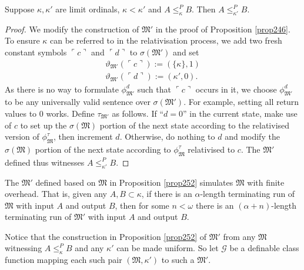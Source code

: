 \documentclass[12pt]{article}
\numberwithin{equation}{section}
\begin{document}
\begin{prop}\label{prop252}
Suppose $\kappa, \kappa'$ are limit ordinals, $\kappa < \kappa'$ and $A \leq^P_{\kappa} B$. Then $A \leq^P_{\kappa'} B$.
\end{prop}

\begin{proof}
We modify the construction of $\mathfrak{M}'$ in the proof of Proposition \ref{prop246}. To ensure $\kappa$ can be referred to in the relativisation process, we add two fresh constant symbols $\ulcorner c \urcorner$ and $\ulcorner d \urcorner$ to $\sigma(\mathfrak{M'})$ and set
\begin{gather*}
    \vartheta_{\mathfrak{M}'}(\ulcorner c \urcorner) := (\{\kappa\}, 1) \\
    \vartheta_{\mathfrak{M}'}(\ulcorner d \urcorner) := (\kappa', 0) \text{.}
\end{gather*}
As there is no way to formulate $\phi^d_{\mathfrak{M}'}$ such that $\ulcorner c \urcorner$ occurs in it, we choose $\phi^d_{\mathfrak{M}'}$ to be any universally valid sentence over $\sigma(\mathfrak{M'})$. For example, setting all return values to $0$ works. Define $\tau_{\mathfrak{M}'}$ as follows. If ``$d = 0$'' in the current state, make use of $c$ to set up the $\sigma(\mathfrak{M})$ portion of the next state according to the relativised version of $\phi^{\tau}_{\mathfrak{M}}$, then increment $d$. Otherwise, do nothing to $d$ and modify the $\sigma(\mathfrak{M})$ portion of the next state according to $\phi^{\tau}_{\mathfrak{M}}$ relativised to $c$. The $\mathfrak{M}'$ defined thus witnesses $A \leq^P_{\kappa'} B$.
\end{proof}

\begin{rem}\label{rem256}
The $\mathfrak{M}'$ defined based on $\mathfrak{M}$ in Proposition \ref{prop252} simulates $\mathfrak{M}$ with finite overhead. That is, given any $A, B \subset \kappa$, if there is an $\alpha$-length terminating run of $\mathfrak{M}$ with input $A$ and output $B$, then for some $n < \omega$ there is an $(\alpha + n)$-length terminating run of $\mathfrak{M}'$ with input $A$ and output $B$.
\end{rem}

Notice that the construction in Proposition \ref{prop252} of $\mathfrak{M}'$ from any $\mathfrak{M}$ witnessing $A \leq^P_{\kappa} B$ and any $\kappa'$ can be made uniform. So let $\mathcal{G}$ be a definable class function mapping each such pair $(\mathfrak{M}, \kappa')$ to such a $\mathfrak{M}'$.
\end{document}
